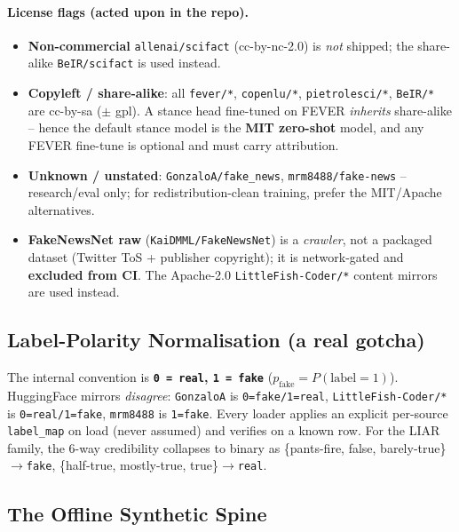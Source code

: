 \documentclass[12pt,a4paper]{article}
\begin{document}
\paragraph{License flags (acted upon in the repo).}
\begin{itemize}\setlength\itemsep{0.15em}
  \item \textbf{Non-commercial} \texttt{allenai/scifact} (cc-by-nc-2.0) is \emph{not} shipped; the share-alike \texttt{BeIR/scifact} is used instead.
  \item \textbf{Copyleft / share-alike}: all \texttt{fever/*}, \texttt{copenlu/*}, \texttt{pietrolesci/*}, \texttt{BeIR/*} are cc-by-sa ($\pm$ gpl). A stance head fine-tuned on FEVER \emph{inherits} share-alike -- hence the default stance model is the \textbf{MIT zero-shot} model, and any FEVER fine-tune is optional and must carry attribution.
  \item \textbf{Unknown / unstated}: \texttt{GonzaloA/fake\_news}, \texttt{mrm8488/fake-news} -- research/eval only; for redistribution-clean training, prefer the MIT/Apache alternatives.
  \item \textbf{FakeNewsNet raw} (\texttt{KaiDMML/FakeNewsNet}) is a \emph{crawler}, not a packaged dataset (Twitter ToS + publisher copyright); it is network-gated and \textbf{excluded from CI}. The Apache-2.0 \texttt{LittleFish-Coder/*} content mirrors are used instead.
\end{itemize}

\subsection{Label-Polarity Normalisation (a real gotcha)}

The internal convention is \textbf{\texttt{0 = real}, \texttt{1 = fake}} ($p_{\text{fake}} = P(\text{label}{=}1)$). HuggingFace mirrors \emph{disagree}: \texttt{GonzaloA} is \texttt{0=fake/1=real}, \texttt{LittleFish-Coder/*} is \texttt{0=real/1=fake}, \texttt{mrm8488} is \texttt{1=fake}. Every loader applies an explicit per-source \texttt{label\_map} on load (never assumed) and verifies on a known row. For the LIAR family, the 6-way credibility collapses to binary as \{pants-fire, false, barely-true\}$\rightarrow$\texttt{fake}, \{half-true, mostly-true, true\}$\rightarrow$\texttt{real}.

\subsection{The Offline Synthetic Spine}
\end{document}
